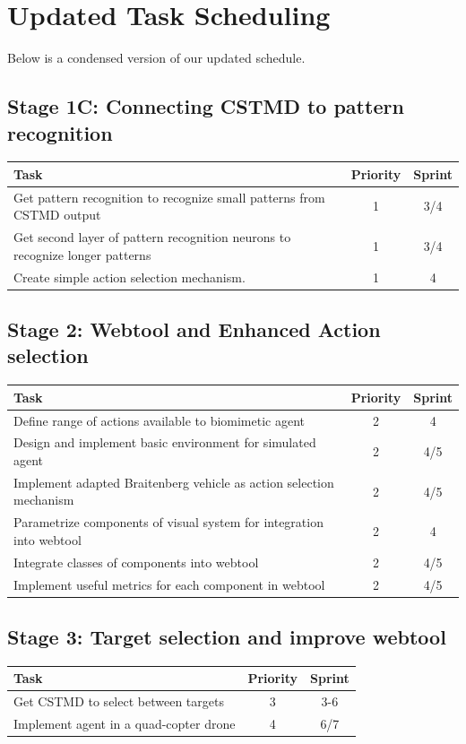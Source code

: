 \documentclass[a4paper,11pt]{article}
\begin{document}
\section{Updated Task Scheduling}	

Below is a condensed version of our updated schedule.

\subsection{Stage 1C: Connecting CSTMD to pattern recognition}
\begin{center}
    \begin{tabular}{p{12cm} c c}
    \textbf{Task} & \textbf{Priority} & \textbf{Sprint} \\ \hline
	Get pattern recognition to recognize small patterns from CSTMD output & 1 & 3/4 \\
	Get second layer of pattern recognition neurons to recognize longer patterns & 1 & 3/4\\
	Create simple action selection mechanism. & 1 & 4 \\
    \end{tabular}
\end{center}

\subsection{Stage 2: Webtool and Enhanced Action selection}
\begin{center}
    \begin{tabular}{p{12cm} c c}
    \textbf{Task} & \textbf{Priority} & \textbf{Sprint} \\ \hline
    Define range of actions available to biomimetic agent & 2 & 4 \\
    Design and implement basic environment for simulated agent & 2 & 4/5 \\
    Implement adapted Braitenberg vehicle as action selection mechanism & 2 & 4/5 \\
	Parametrize components of visual system for integration into webtool & 2 & 4 \\
	Integrate classes of components into webtool & 2 & 4/5 \\	
	Implement useful metrics for each component in webtool & 2 & 4/5 \\
    \end{tabular}
\end{center}

\subsection{Stage 3: Target selection and improve webtool}
\begin{center}
    \begin{tabular}{p{12cm} c c}
    \textbf{Task} & \textbf{Priority} & \textbf{Sprint} \\ \hline
    Get CSTMD to select between targets & 3 & 3-6 \\
    Implement agent in a quad-copter drone & 4 & 6/7 \\
    \end{tabular}
\end{center}
\end{document}
